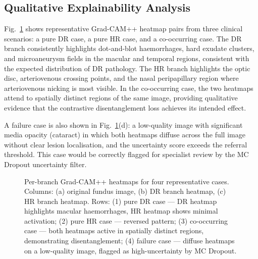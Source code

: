 \documentclass[review,12pt]{elsarticle}
\begin{document}
\subsection{Qualitative Explainability Analysis}

Fig.~\ref{fig:heatmaps} shows representative Grad-CAM++ heatmap pairs from
three clinical scenarios: a pure DR case, a pure HR case, and a co-occurring
case. The DR branch consistently highlights dot-and-blot haemorrhages, hard
exudate clusters, and microaneurysm fields in the macular and temporal regions,
consistent with the expected distribution of DR pathology. The HR branch
highlights the optic disc, arteriovenous crossing points, and the nasal
peripapillary region where arteriovenous nicking is most visible. In the
co-occurring case, the two heatmaps attend to spatially distinct regions of
the same image, providing qualitative evidence that the contrastive
disentanglement loss achieves its intended effect.

A failure case is also shown in Fig.~\ref{fig:heatmaps}(d): a low-quality
image with significant media opacity (cataract) in which both heatmaps
diffuse across the full image without clear lesion localisation, and the
uncertainty score exceeds the referral threshold. This case would be correctly
flagged for specialist review by the MC Dropout uncertainty filter.

\begin{figure}[htbp]
  \centering
  \caption{Per-branch Grad-CAM++ heatmaps for four representative cases.
  Columns: (a) original fundus image, (b) DR branch heatmap, (c) HR branch
  heatmap. Rows: (1) pure DR case — DR heatmap highlights macular haemorrhages,
  HR heatmap shows minimal activation; (2) pure HR case — reversed pattern;
  (3) co-occurring case — both heatmaps active in spatially distinct regions,
  demonstrating disentanglement; (4) failure case — diffuse heatmaps on a
  low-quality image, flagged as high-uncertainty by MC Dropout.}
  \label{fig:heatmaps}
\end{figure}
\end{document}
